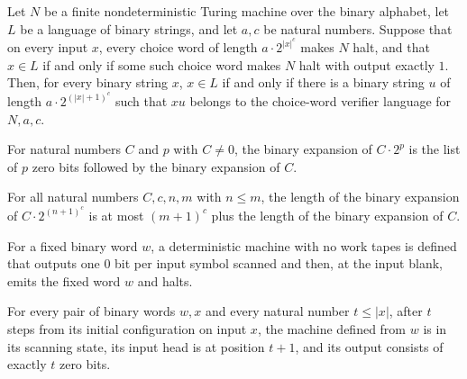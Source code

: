 \begin{lemma}
\label{Complexity.e3_choice_certificate}
\leanok
{}
Let $N$ be a finite nondeterministic Turing machine over the binary alphabet, let $L$ be
a language of binary strings, and let $a,c$ be natural numbers. Suppose that on every
input $x$, every choice word of length $a\cdot 2^{|x|^c}$ makes $N$ halt, and that $x\in
L$ if and only if some such choice word makes $N$ halt with output exactly $1$. Then,
for every binary string $x$, $x\in L$ if and only if there is a binary string $u$ of
length $a\cdot 2^{(|x|+1)^c}$ such that $xu$ belongs to the choice-word verifier
language for $N,a,c$.
\end{lemma}

\begin{lemma}
\label{Complexity.e3_bits_shift}
\leanok
{}
For natural numbers $C$ and $p$ with $C\ne 0$, the binary expansion of $C\cdot 2^p$ is
the list of $p$ zero bits followed by the binary expansion of $C$.
\end{lemma}

\begin{lemma}
\label{Complexity.e3_bits_length_bound}
\leanok
{}
For all natural numbers $C,c,n,m$ with $n\le m$, the length of the binary expansion of
$C\cdot 2^{(n+1)^c}$ is at most $(m+1)^c$ plus the length of the binary expansion of
$C$.
\end{lemma}

\begin{definition}
\label{Complexity.e3ShiftTM}
\leanok
{}
For a fixed binary word $w$, a deterministic machine with no work tapes is defined that outputs one $0$ bit per input symbol scanned and then, at the input blank, emits the fixed word $w$ and halts.
\end{definition}

\begin{lemma}
\label{Complexity.e3_shift_scan}
\leanok
{}
For every pair of binary words $w,x$ and every natural number $t\le |x|$, after $t$
steps from its initial configuration on input $x$, the machine defined from $w$ is in
its scanning state, its input head is at position $t+1$, and its output consists of
exactly $t$ zero bits.
\end{lemma}

